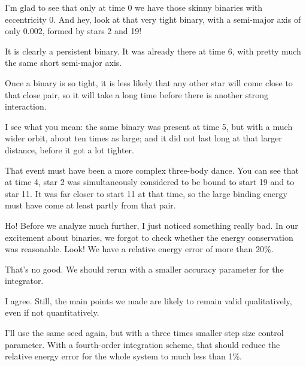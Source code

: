 \abc

\bob
I'm glad to see that only at time 0 we have those skinny binaries with
eccentricity 0.  And hey, look at that very tight binary, with a
semi-major axis of only $0.002$, formed by stars 2 and 19!

\carol
It is clearly a persistent binary.  It was already there at time 6,
with pretty much the same short semi-major axis.

\alice
Once a binary is so tight, it is less likely that any other star will
come close to that close pair, so it will take a long time before
there is another strong interaction.

\bob
I see what you mean: the same binary was present at time 5, but with a
much wider orbit, about ten times as large; and it did not last long
at that larger distance, before it got a lot tighter.

\alice
That event must have been a more complex three-body dance.  You can
see that at time 4, star 2 was simultaneously considered to be bound
to start 19 and to star 11.  It was far closer to start 11 at that
time, so the large binding energy must have come at least partly from
that pair.

\bob
Ho!  Before we analyze much further, I just noticed something really bad.
In our excitement about binaries, we forgot to check whether the energy
conservation was reasonable.  Look!  We have a relative energy error
of more than 20\%.

\carol
That's no good.  We should rerun with a smaller accuracy parameter for
the integrator.

\alice
I agree.  Still, the main points we made are likely to remain valid
qualitatively, even if not quantitatively.

\bob
I'll use the same seed again, but with a three times smaller step size
control parameter.  With a fourth-order integration scheme, that
should reduce the relative energy error for the whole system to much
less than 1\%.

\cba

